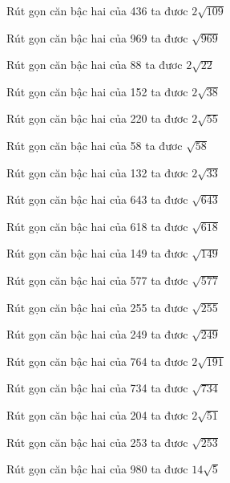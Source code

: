 \documentclass[12pt,a4paper]{article}
\begin{document}
\begin{ex}
Rút gọn căn bậc hai của 436 ta đươc $2\sqrt{109}$
\end{ex}
\begin{ex}
Rút gọn căn bậc hai của 969 ta đươc $\sqrt{969}$
\end{ex}
\begin{ex}
Rút gọn căn bậc hai của 88 ta đươc $2\sqrt{22}$
\end{ex}
\begin{ex}
Rút gọn căn bậc hai của 152 ta đươc $2\sqrt{38}$
\end{ex}
\begin{ex}
Rút gọn căn bậc hai của 220 ta đươc $2\sqrt{55}$
\end{ex}
\begin{ex}
Rút gọn căn bậc hai của 58 ta đươc $\sqrt{58}$
\end{ex}
\begin{ex}
Rút gọn căn bậc hai của 132 ta đươc $2\sqrt{33}$
\end{ex}
\begin{ex}
Rút gọn căn bậc hai của 643 ta đươc $\sqrt{643}$
\end{ex}
\begin{ex}
Rút gọn căn bậc hai của 618 ta đươc $\sqrt{618}$
\end{ex}
\begin{ex}
Rút gọn căn bậc hai của 149 ta đươc $\sqrt{149}$
\end{ex}
\begin{ex}
Rút gọn căn bậc hai của 577 ta đươc $\sqrt{577}$
\end{ex}
\begin{ex}
Rút gọn căn bậc hai của 255 ta đươc $\sqrt{255}$
\end{ex}
\begin{ex}
Rút gọn căn bậc hai của 249 ta đươc $\sqrt{249}$
\end{ex}
\begin{ex}
Rút gọn căn bậc hai của 764 ta đươc $2\sqrt{191}$
\end{ex}
\begin{ex}
Rút gọn căn bậc hai của 734 ta đươc $\sqrt{734}$
\end{ex}
\begin{ex}
Rút gọn căn bậc hai của 204 ta đươc $2\sqrt{51}$
\end{ex}
\begin{ex}
Rút gọn căn bậc hai của 253 ta đươc $\sqrt{253}$
\end{ex}
\begin{ex}
Rút gọn căn bậc hai của 980 ta đươc $14\sqrt{5}$
\end{ex}
\end{document}
